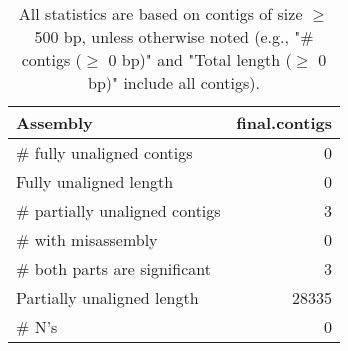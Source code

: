 \documentclass[12pt,a4paper]{article}
\begin{document}
\begin{table}[ht]
\begin{center}
\caption{All statistics are based on contigs of size $\geq$ 500 bp, unless otherwise noted (e.g., "\# contigs ($\geq$ 0 bp)" and "Total length ($\geq$ 0 bp)" include all contigs).}
\begin{tabular}{|l*{1}{|r}|}
\hline
Assembly & final.contigs \\ \hline
\# fully unaligned contigs & 0 \\ \hline
Fully unaligned length & 0 \\ \hline
\# partially unaligned contigs & 3 \\ \hline
\hspace{5mm}\# with misassembly & 0 \\ \hline
\hspace{5mm}\# both parts are significant & 3 \\ \hline
Partially unaligned length & 28335 \\ \hline
\# N's & 0 \\ \hline
\end{tabular}
\end{center}
\end{table}
\end{document}

